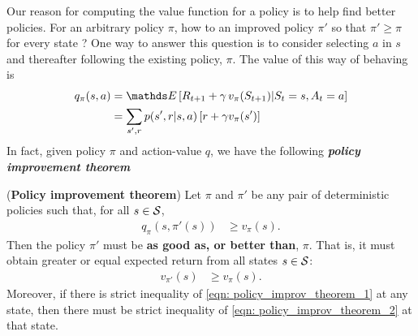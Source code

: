 \documentclass[11pt]{article}
\begin{document}
Our reason for computing the value function for a policy is to help find better policies. For an arbitrary policy $\pi$, how to an improved policy $\pi'$ so that $\pi' \ge \pi$ for every state ?  One way to answer this question is to consider selecting $a$ in $s$ and thereafter following the existing policy, $\pi$. The value of this way of behaving is
\begin{align*}
q_{\pi}(s, a) &= \E{}{R_{t+1} + \gamma\,v_{\pi}(S_{t+1}) | S_{t}=s, A_{t}=a} \\
&= \sum_{s', r}p(s', r | s, a)\brac{r+ \gamma v_{\pi}(s')}
\end{align*} In fact, given policy $\pi$ and action-value $q$, we have the following \emph{\textbf{policy improvement theorem}}
\begin{theorem} (\textbf{Policy improvement theorem})
Let $\pi$ and $\pi'$ be any pair of deterministic policies such that, for all $s \in {\mathcal S}$, 
\begin{align}
q_{\pi}(s, \pi'(s)) &\ge v_{\pi}(s). \label{eqn: policy_improv_theorem_1}
\end{align}
Then the policy $\pi'$ must be\textbf{ as good as, or better than}, $\pi$. That is, it must obtain greater or equal expected return from all states $s \in {\mathcal S}$:
\begin{align}
v_{\pi'}(s) &\ge v_{\pi}(s).  \label{eqn: policy_improv_theorem_2}
\end{align} Moreover, if there is strict inequality of \eqref{eqn: policy_improv_theorem_1} at any state, then there must be strict inequality of \eqref{eqn: policy_improv_theorem_2} at that state. 
\end{theorem}
\end{document}

